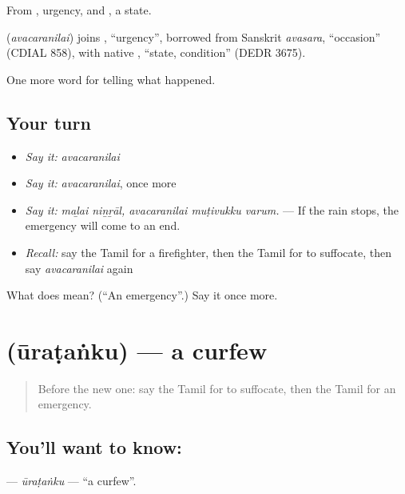 From , urgency, and , a state.

\begin{cousinweb}
\textbf{} (\emph{avacaranilai}) joins , \textquotedblleft{}urgency\textquotedblright{}, borrowed from Sanskrit \emph{avasara}, \textquotedblleft{}occasion\textquotedblright{} (CDIAL 858), with native , \textquotedblleft{}state, condition\textquotedblright{} (DEDR 3675).
\end{cousinweb}

\begin{grammarlens}[title={What you've built}]
One more word for telling what happened.
\end{grammarlens}

\subsection*{Your turn}
\begin{itemize}
\raggedright
  \item \emph{Say it:} \emph{avacaranilai}
  \item \emph{Say it:} \emph{avacaranilai}, once more
  \item \emph{Say it:} \emph{maḻai niṉṟāl, avacaranilai muṭivukku varum.} — If the rain stops, the emergency will come to an end.
  \item \emph{Recall:} say the Tamil for a firefighter, then the Tamil for to suffocate, then say \emph{avacaranilai} again
\end{itemize}

\begin{tcolorbox}[breakable,colback=teal!4,colframe=teal!35!black,title={Before you move on}]
What does  mean? (\textquotedblleft{}An emergency\textquotedblright{}.) Say it once more.
\end{tcolorbox}
\section[\texorpdfstring{\ta{ஊரடங்கு} (ūraṭaṅku)}{ஊரடங்கு (ūraṭaṅku)}]{ (ūraṭaṅku) — a curfew}

\label{lesson:TA-C300-uratanku}



\begin{quote}
Before the new one: say the Tamil for to suffocate, then the Tamil for an emergency.
\end{quote}

\subsection*{You'll want to know: }
\textbf{} — \emph{ūraṭaṅku} — \textquotedblleft{}a curfew\textquotedblright{}.

